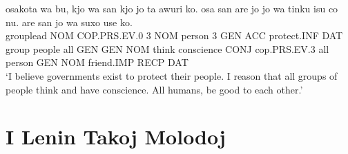 \documentclass{clgrammar}
\begin{document}
\begin{exe}
	\ex
	\gll osakota wa bu, kjo wa san kjo jo ta awuri ko. osa san are jo jo wa tinku isu co nu. are san jo wa suxo use ko. \\
		grouplead NOM COP.PRS.EV.0 3 NOM person 3 GEN ACC protect.INF DAT group people all GEN GEN NOM think conscience CONJ cop.PRS.EV.3 all person GEN NOM friend.IMP RECP DAT \\
	\trans `I believe governments exist to protect their people. I reason that all groups of people think and have conscience. All humans, be good to each other.'
\end{exe}

\chapter{I Lenin Takoj Molodoj}
\end{document}
